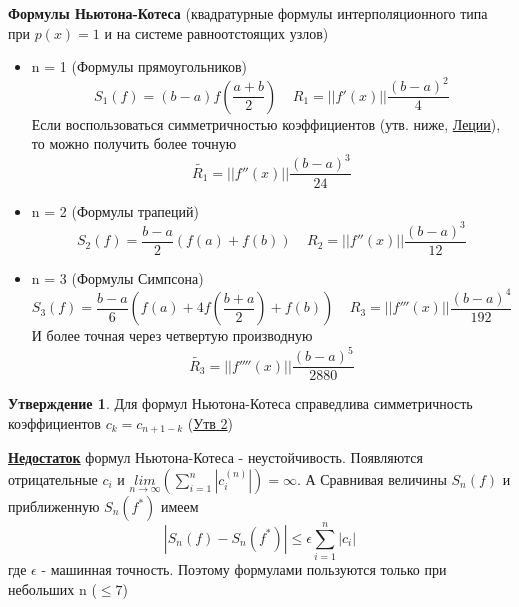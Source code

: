 \documentclass[specialist, subf, href, colorlinks=true, 12pt, times, mtpro, final]{disser}
\theoremstyle{definition}
\newtheorem{state}{Утверждение}[section]
\begin{document}
    \textbf{Формулы Ньютона-Котеса} (квадратурные формулы интерполяционного типа при $p(x) = 1$ и на системе равноотстоящих узлов)
    \begin{itemize}
        \item n = 1 (Формулы прямоугольников)
        $$
            S_1(f) = (b-a)f\left(\frac{a+b}{2}\right) \ \ \ \ \ R_1 = ||f'(x)||\frac{(b - a)^2}{4}
        $$
        Если воспользоваться симметричностью коэффициентов (утв. ниже, \hyperlink {lects.39}{Леции}), то можно получить более точную  
        $$
            \tilde{R_1} = ||f''(x)||\frac{(b-a)^3}{24}
        $$
        \item n = 2 (Формулы трапеций)
        $$
            S_2(f) = \frac{b - a}{2}(f(a) + f(b)) \ \ \ \ \ R_2 = ||f''(x)||\frac{(b-a)^3}{12}
        $$
        \item n = 3 (Формулы Симпсона)
        $$
            S_3(f) = \frac{b - a}{6}\left(f(a) + 4f\left(\frac{b+a}{2}\right) + f(b)\right) \ \ \ \ \ R_3 = ||f'''(x)||\frac{(b-a)^4}{192}
        $$
        И более точная через четвертую производную
        $$
            \tilde{R_3} = ||f''''(x)||\frac{(b-a)^5}{2880}
        $$
    \end{itemize}

    \begin{state}
        Для формул Ньютона-Котеса справедлива симметричность коэффициентов $c_k = c_{n+1-k}$ (\hyperlink {lects.40}{Утв 2})
    \end{state}

    \textbf{\hyperlink {lects.39}{Недостаток}} формул Ньютона-Котеса - неустойчивость. Появляются отрицательные $c_i$ и $\underset{n\rightarrow \infty}{lim} \left(\sum\limits_{i=1}^n |c_i^{(n)}| \right) = \infty$. А Сравнивая величины $S_n(f)$ и приближенную $S_n(f^*)$ имеем 
    $$
        |S_n(f) - S_n(f^*)| \le \epsilon \sum\limits_{i = 1}^n |c_i|
    $$
    где $\epsilon$ - машинная точность. Поэтому формулами пользуются только при небольших n ($\le7$)
\end{document}

